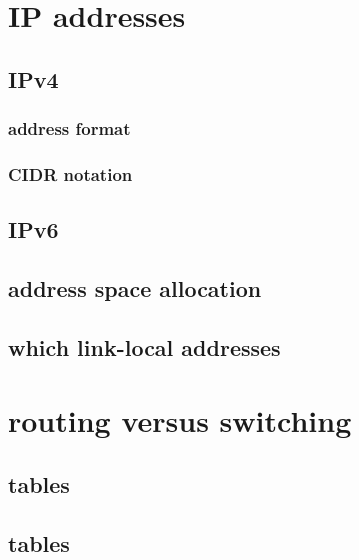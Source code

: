 \date{}
\title{}
\date{}

\begin{frame}
    \titlepage
\end{frame}

\section{IP addresses}

\subsection{IPv4}

\subsubsection{address format}


\subsubsection{CIDR notation}


\subsection{IPv6}


\subsection{address space allocation}


\subsection{which link-local addresses}


\section{routing versus switching}
\subsection{tables}

\subsection{tables}


